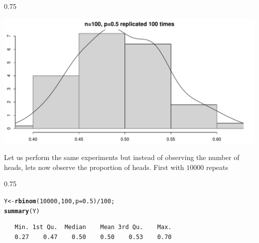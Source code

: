 \documentclass{beamer}\usepackage[]{graphicx}\usepackage[]{color}
\makeatletter
\newcommand{\hlnum}[1]{\textcolor[rgb]{0.2,0.2,0.2}{#1}}%
\newcommand{\hlopt}[1]{\textcolor[rgb]{0.102,0.102,0.102}{#1}}%
\newcommand{\hlstd}[1]{\textcolor[rgb]{0.102,0.102,0.102}{#1}}%
\newcommand{\hlkwb}[1]{\textcolor[rgb]{0.102,0.102,0.102}{#1}}%
\newcommand{\hlkwc}[1]{\textcolor[rgb]{0.2,0.2,0.2}{#1}}%
\newcommand{\hlkwd}[1]{\textcolor[rgb]{0.102,0.102,0.102}{\textbf{#1}}}%
\newenvironment{kframe}{%
 \def\at@end@of@kframe{}%
 \ifinner\ifhmode%
  \def\at@end@of@kframe{\end{minipage}}%
  \begin{minipage}{\columnwidth}%
 \fi\fi%
 \def\FrameCommand##1{\hskip\@totalleftmargin \hskip-\fboxsep
 \colorbox{shadecolor}{##1}\hskip-\fboxsep
     \hskip-\linewidth \hskip-\@totalleftmargin \hskip\columnwidth}%
 \MakeFramed {\advance\hsize-\width
   \@totalleftmargin\z@ \linewidth\hsize
   \@setminipage}}%
 {\par\unskip\endMakeFramed%
 \at@end@of@kframe}
\newenvironment{knitrout}{}{} %
\renewenvironment{knitrout}{\begin{spacing}{0.75}\begin{tiny}}{\end{tiny}\end{spacing}}
\makeatother
\begin{document}
\begin{frame}[fragile]

\begin{knitrout}\small
{}\color{fgcolor}

{\centering \includegraphics[width=0.89\linewidth]{figure/graphics-unnamed-chunk-11-1} 

}



\end{knitrout}

\end{frame}


\begin{frame}[fragile]

Let us perform the same experiments but instead of observing the number of heads, lets now observe the proportion of heads. First with $10000$ repeats

\begin{knitrout}\small
{}\color{fgcolor}\begin{kframe}
\begin{alltt}
\hlstd{Y} \hlkwb{<-} \hlkwd{rbinom}\hlstd{(}\hlnum{10000}\hlstd{,} \hlnum{100}\hlstd{,} \hlkwc{p}\hlstd{=}\hlnum{0.5}\hlstd{)}\hlopt{/} \hlnum{100}\hlstd{;}
\hlkwd{summary}\hlstd{(Y)}
\end{alltt}
\begin{verbatim}
   Min. 1st Qu.  Median    Mean 3rd Qu.    Max. 
   0.27    0.47    0.50    0.50    0.53    0.70 
\end{verbatim}
\end{kframe}
\end{knitrout}

\end{frame}
\end{document}
